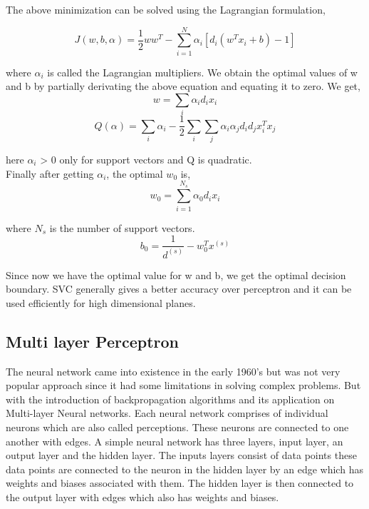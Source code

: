 \documentclass[sigconf]{acmart}
\begin{document}
The above minimization can be solved using the Lagrangian formulation,

\begin{equation}
    J(w,b,\alpha) = \frac{1}{2}ww^T - \sum^{N}_{i=1}\alpha_i[ d_i(w^Tx_i +b)-1]
\end{equation}

where $\alpha_i$ is called the Lagrangian multipliers. We obtain the optimal values of w and b by partially derivating the above equation and equating it to zero. We get,
\begin{equation}
    w = \sum_i \alpha_id_ix_i
\end{equation}
\begin{equation}
    Q(\alpha) = \sum_i \alpha_i - \frac{1}{2}\sum_i\sum_j \alpha_i\alpha_jd_id_jx_i^Tx_j
\end{equation}

here $\alpha_i$ > 0 only for support vectors and Q is quadratic.\\
Finally after getting $\alpha_i$, the optimal $w_0$ is,
\begin{equation}
    w_0 = \sum_{i=1}^{N_s} \alpha_0d_ix_i
\end{equation}

where $N_s$ is the number of support vectors. 
\begin{equation}
    b_0 = \frac{1}{d^(s)} - w_0^Tx^{(s)}
\end{equation}

Since now we have the optimal value for w and b, we get the optimal decision boundary. SVC generally gives a better accuracy over perceptron and it can be used efficiently for high dimensional planes.\cite{Williamson2}
\subsection{Multi layer Perceptron}

The neural network came into existence in the early 1960's but was not very popular approach since it had some limitations in solving complex problems. But with the introduction of backpropagation algorithms and its application on Multi-layer Neural networks. Each neural network comprises of individual neurons which are also called perceptions. These neurons are connected to one another with edges. A simple neural network has three layers, input layer, an output layer and the hidden layer. The inputs layers consist of data points these data points are connected to the neuron in the hidden layer by an edge which has weights and biases associated with them. The hidden layer is then connected to the output layer with edges which also has weights and biases.\cite{Williamson1}
\end{document}

